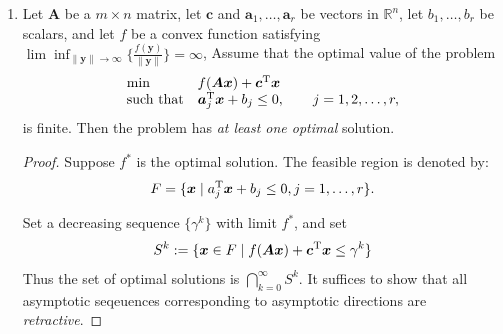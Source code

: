 \begin{enumerate}
\begin{proof}
\begin{enumerate}
\[\]
for some $z$ on secant line between $x$ and $y$. It follows that
\begin{equation}
\inp{\nabla f(x)}{y-x}+\frac{1}{2}m\|y-x\|^2\le f(y)-f(x)\le\inp{\nabla f(x)}{y-x}+\frac{1}{2}M\|y-x\|^2\label{Eq:2}
\end{equation}
Taking the infimum of $y$ over Eq.(\ref{Eq:2}), we derive:
\begin{align*}
\inf_{y\in X}\left\{\inp{\nabla f(x)}{y-x}+\frac{1}{2}m\|y-x\|^2\right\}&=-\theta_m(x)\\
&\le \inf_{y\in X}f(y)-f(x)=f(x^*)-f(x)\\
&\le\inf_{y\in X}\left\{\inp{\nabla f(x)}{y-x}+\frac{1}{2}M\|y-x\|^2\right\}\\&=-\theta_M(x)
\end{align*}
Or equivalently, $\theta_M(x)\le f(x)-f(x^*)\le \theta_m(x)$.


\end{enumerate}



\end{proof}
\item
Let $\bm A$ be a $m\times n$ matrix, let $\bm c$ and $\bm a_1,\dots,\bm a_r$ be vectors in $\mathbb{R}^n$, let $b_1,\dots,b_r$ be scalars, and let $f$ be a convex function satisfying $\lim\inf_{\|\bm y\|\to\infty}\{\frac{f(\bm y)}{\|\bm y\|}\}=\infty$, Assume that the optimal value of the problem
\begin{equation}
\begin{array}{ll}
\min&f(\bm{Ax})+\bm c^{\mathrm T}\bm x\\
\mbox{such that}&\bm a_j^{\mathrm T}\bm x+b_j\le0,\qquad j=1,2,\dots,r,
\end{array}
\end{equation}
is finite. Then the problem has \emph{at least one optimal} solution.
\begin{proof}
Suppose $f^*$ is the optimal solution. The feasible region is denoted by:
\[
F=\{\bm x \mid a_j^{\mathrm T}\bm x+b_j\le0,j=1,\dots,r\}.
\] 

Set a decreasing sequence $\{\gamma^k\}$ with limit $f^*$, and set
\[
S^k:=\{\bm x\in F\mid f(\bm{Ax})+\bm c^{\mathrm T}\bm x\le\gamma^k\}
\]
Thus the set of optimal solutions is $\bigcap_{k=0}^\infty S^k$. It suffices to show that all asymptotic seqeuences corresponding to asymptotic directions are \emph{retractive}.


\end{proof}
\end{enumerate}
